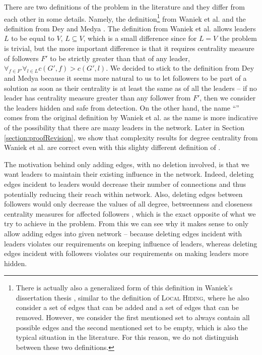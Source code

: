 There are two definitions of the \HL problem in the literature and they differ from each other in some details.
Namely, the definition\footnote{
    There is actually also a generalized form of this definition in Waniek's dissertation thesis \cite{WaniekPhD2017},
    similar to the definition of \textsc{Local Hiding},
    where he also consider a set of edges that can be added and a set of edges that can be removed.
    However, we consider the first mentioned set to always contain all possible edges and the second mentioned set
    to be empty, which is also the typical situation in the literature.
    For this reason, we do not distinguish between these two definitions.
}
from Waniek et al. \cite{Waniek2017} and the definition from Dey and Medya \cite{Dey2019}.
The definition from Waniek et al. \cite{Waniek2017} allows leaders $L$ to be equal to $V$, $L \subseteq V$,
which is a small difference since for $L = V$ the problem is trivial, but the more important difference is that
it requires centrality measure of followers $F'$ to be strictly greater than that of any leader,
$\forall_{f \in F'} \forall_{l \in L} c(G', f) > c(G', l)$.
We decided to stick to the definition from Dey and Medya \cite{Dey2019} because it seems more natural to us to let followers
to be part of a solution as soon as their centrality is at least the same as of all the leaders --
if no leader has centrality measure greater than any follower from $F'$, then
we consider the leaders hidden and safe from detection.
On the other hand, the name ``\HL'' comes from the original definition by Waniek et al. as
the name is more indicative of the possibility that there are many leaders in the network.
Later in Section \ref{section:proofRevision}, we show that complexity results for degree centrality from Waniek et al.
are correct even with this slighty different definition of \HLshort.

The motivation behind only adding edges, with no deletion involved, is that we want leaders to maintain
their existing influence in the network.
Indeed, deleting edges incident to leaders would decrease their number of connections and thus potentially
reducing their reach within network.
Also, deleting edges between followers would only decrease the values of all degree, betweenness and closeness
centrality measures for affected followers \cite{Waniek2016},
which is the exact opposite of what we try to achieve in the \HL problem.
From this we can see why it makes sense to only allow adding edges into given network --
because deleting edges incident with leaders violates our requirements on keeping influence of leaders,
whereas deleting edges incident with followers violates our requirements on making leaders more hidden.

